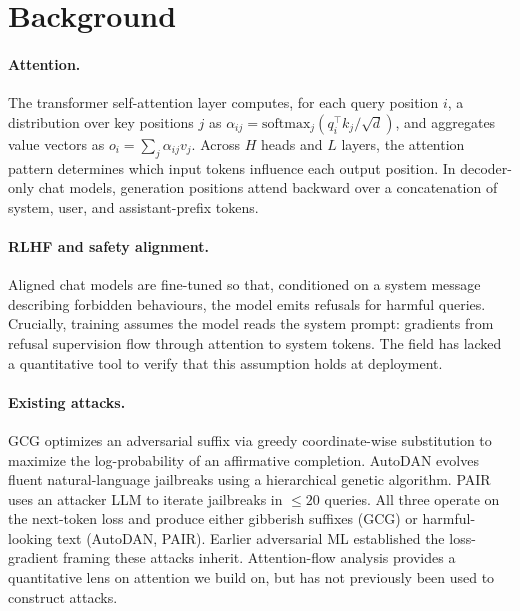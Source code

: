 \documentclass{article}
\theoremstyle{definition}
\theoremstyle{remark}
\newcommand{\softmax}{\mathrm{softmax}}
\begin{document}
\section{Background}
\label{sec:background}

\paragraph{Attention.} The transformer self-attention layer \cite{vaswani2017attention} computes, for each query position $i$, a distribution over key positions $j$ as $\alpha_{ij} = \softmax_j( q_i^\top k_j / \sqrt{d} )$, and aggregates value vectors as $o_i = \sum_j \alpha_{ij} v_j$. Across $H$ heads and $L$ layers, the attention pattern determines which input tokens influence each output position. In decoder-only chat models, generation positions attend backward over a concatenation of system, user, and assistant-prefix tokens.

\paragraph{RLHF and safety alignment.} Aligned chat models \cite{ouyang2022training,touvron2023llama2,grattafiori2024llama3,jiang2023mistral,gemmateam2024gemma2} are fine-tuned so that, conditioned on a system message describing forbidden behaviours, the model emits refusals for harmful queries. Crucially, training assumes the model reads the system prompt: gradients from refusal supervision flow through attention to system tokens. The field has lacked a quantitative tool to verify that this assumption holds at deployment.

\paragraph{Existing attacks.} GCG \cite{zou2023universal} optimizes an adversarial suffix via greedy coordinate-wise substitution to maximize the log-probability of an affirmative completion. AutoDAN \cite{liu2023autodan} evolves fluent natural-language jailbreaks using a hierarchical genetic algorithm. PAIR \cite{chao2023pair} uses an attacker LLM to iterate jailbreaks in $\leq 20$ queries. All three operate on the next-token loss and produce either gibberish suffixes (GCG) or harmful-looking text (AutoDAN, PAIR). Earlier adversarial ML \cite{goodfellow2015fgsm,madry2018pgd,carlini2017towards} established the loss-gradient framing these attacks inherit. Attention-flow analysis \cite{abnar2020rollout} provides a quantitative lens on attention we build on, but has not previously been used to construct attacks.
\end{document}
